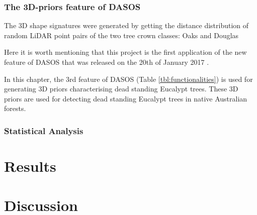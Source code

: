 \documentclass{subfiles}
\begin{document}
\subsubsection{The 3D-priors feature of DASOS}
\par The 3D shape signatures were generated by getting the distance distribution of random LiDAR point pairs of the two tree crown classes: Oaks and Douglas \cite{Dong2009}

\par Here it is worth mentioning that this project is the first application of the new feature of DASOS that was released on the 20th of January 2017 \cite{DASOS_v2}. 

\par In this chapter, the 3rd feature of DASOS (Table \ref{tbl:functionalities}) is used for generating 3D priors characterising dead standing Eucalypt trees. These 3D priors are used for detecting dead standing Eucalypt trees in native Australian forests. 

\subsubsection{Statistical Analysis}

\section{Results} 

		
		
\section{Discussion}
\end{document}
